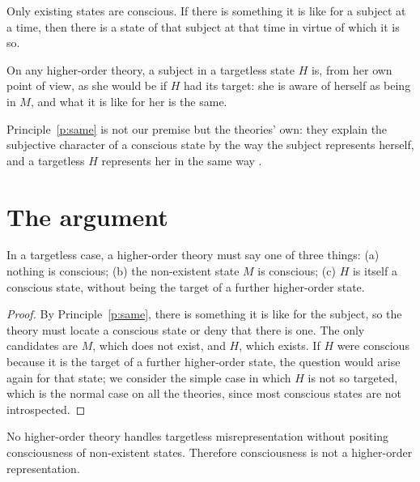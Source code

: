 \documentclass{situationist-preprint}
\begin{document}
\begin{principle}[Existence]\label{p:exist}
Only existing states are conscious. If there is something it is like for a subject at a time, then there is a state of that subject at that time in virtue of which it is so.
\end{principle}

\begin{principle}\label{p:same}
On any higher-order theory, a subject in a targetless state $H$ is, from her own point of view, as she would be if $H$ had its target: she is aware of herself as being in $M$, and what it is like for her is the same.
\end{principle}

Principle~\ref{p:same} is not our premise but the theories' own: they explain the subjective character of a conscious state by the way the subject represents herself, and a targetless $H$ represents her in the same way \citep{Rosenthal2011}.

\section{The argument}

\begin{lemma}\label{l:three}
In a targetless case, a higher-order theory must say one of three things: (a) nothing is conscious; (b) the non-existent state $M$ is conscious; (c) $H$ is itself a conscious state, without being the target of a further higher-order state.
\end{lemma}

\begin{proof}
By Principle~\ref{p:same}, there is something it is like for the subject, so the theory must locate a conscious state or deny that there is one. The only candidates are $M$, which does not exist, and $H$, which exists. If $H$ were conscious because it is the target of a further higher-order state, the question would arise again for that state; we consider the simple case in which $H$ is not so targeted, which is the normal case on all the theories, since most conscious states are not introspected.
\end{proof}

\begin{theorem}\label{t:main}
No higher-order theory handles targetless misrepresentation without positing consciousness of non-existent states. Therefore consciousness is not a higher-order representation.
\end{theorem}
\end{document}

